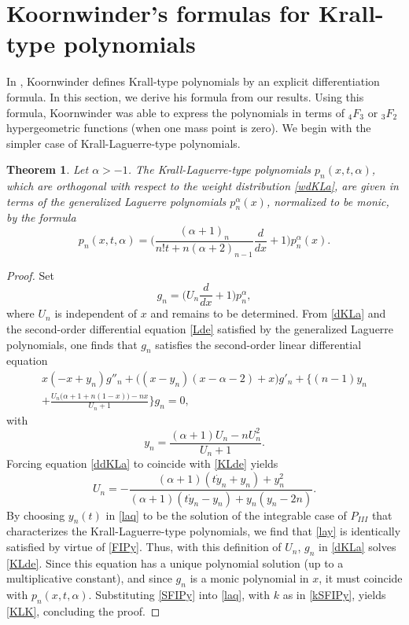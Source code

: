 \documentclass[10pt, reqno]{amsart}
\numberwithin{equation}{section}
\newtheorem{theorem}{Theorem}[section]
\numberwithin{equation}{section}
\begin{document}
\section{Koornwinder's formulas for Krall-type polynomials}
In \cite{Ko}, Koornwinder defines Krall-type polynomials by an explicit differentiation formula. In this section, we derive his formula from our results. Using this formula, Koornwinder was able to express the polynomials in terms of $_4F_3$ or $_3F_2$ hypergeometric functions (when one mass point is zero). We begin with the simpler case of Krall-Laguerre-type polynomials. 
\begin{theorem}\label{theorem 6.1}
Let $\alpha>-1$. The Krall-Laguerre-type polynomials $p_n(x, t,\alpha)$, which are orthogonal with respect to the weight distribution \eqref{wdKLa}, are given in terms of the generalized Laguerre polynomials $p_n^{\alpha}(x)$, normalized to be monic, by the formula 
\begin{equation}
p_n(x,t,\alpha)=\Big(\frac{(\alpha+1)_n}{n!t+n(\alpha+2)_{n-1}}\frac{d}{dx}+1\Big)p_n^{\alpha}(x).\label{KLK}
\end{equation}
\end{theorem} 
\begin{proof}
Set
\begin{equation}
g_n=\Big(U_n\frac{d}{dx}+1\Big)p_n^\alpha,\label{dKLa}
\end{equation}
where $U_n$ is independent of $x$ and remains to be determined. From \eqref{dKLa} and the second-order differential equation \eqref{Lde} satisfied by the generalized Laguerre polynomials, one finds that $g_n$ satisfies the second-order linear differential equation
\begin{multline}
x(-x+y_n)g''_n+\big((x-y_n)(x-\alpha-2)+x\big)g'_n+\Big\{(n-1)y_n\\
+\frac{U_n\big(\alpha+1+n(1-x)\big)-nx}{U_n+1}\Big\}g_n=0, \label{ddKLa}
\end{multline}
with
\begin{equation}
y_n=\frac{(\alpha+1)U_n-nU_n^2}{U_n+1}.\label{lay}
\end{equation}
Forcing equation \eqref{ddKLa} to coincide with \eqref{KLde} yields
\begin{equation}
U_n=-\frac{(\alpha+1)(t\dot{y}_n+y_n)+y_n^2}{(\alpha+1)(t\dot{y}_n-y_n)+y_n(y_n-2n)}.\label{laq}
\end{equation}
By choosing $y_n(t)$  in \eqref{laq} to be the solution of the integrable case of $P_{III}$ that characterizes the Krall-Laguerre-type polynomials, we find that \eqref{lay} is identically satisfied by virtue of \eqref{FIPy}. Thus, with this definition of $U_n$, $g_n$  in \eqref{dKLa} solves \eqref{KLde}. Since this equation has a unique polynomial solution (up to a multiplicative constant), and since $g_n$ is a monic polynomial in $x$, it must coincide with $p_n(x,t,\alpha)$. Substituting \eqref{SFIPy} into \eqref{laq}, with $k$ as in \eqref{kSFIPy}, yields \eqref{KLK}, concluding the proof. 
\end{proof}
\end{document}
